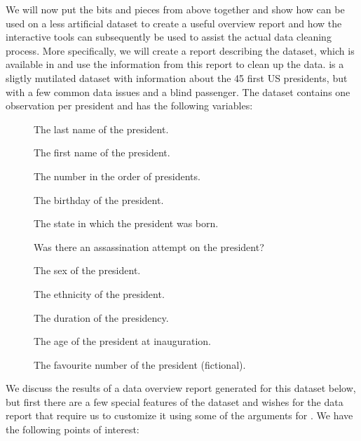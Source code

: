 \documentclass[article,shortnames]{jss}
\begin{document}
We will now put the bits and pieces from above together and show how  can be used on a less artificial dataset to create a useful overview report and how the interactive tools can subsequently be used to assist the actual data cleaning process. More specifically, we will create a report describing the  dataset, which is available in  and use the information from this report to clean up the data.  is a sligtly mutilated dataset with information about the 45 first US presidents, but with a few common data issues and a blind passenger. The dataset contains one observation per president and has the following variables:
\begin{description}
\item[] The last name of the president.
\item[] The first name of the president.
\item[] The number in the order of presidents.
\item[] The birthday of the president.
\item[] The state in which the president was born.
\item[] Was there an assassination attempt on the president?
\item[] The sex of the president.
\item[] The ethnicity of the president.
\item[] The duration of the presidency.
\item[] The age of the president at inauguration.
\item[] The favourite number of the president (fictional).
\end{description}
We discuss the results of a data overview report generated for this dataset below, but first there are a few special features of the dataset and wishes for the data report that require us to customize it using some of the arguments for . We have the following points of interest:
\end{document}
